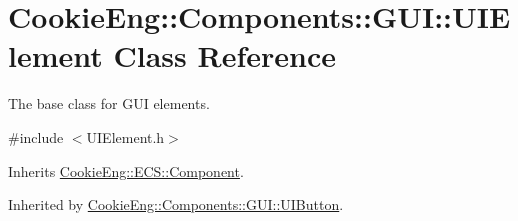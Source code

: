 \hypertarget{class_cookie_eng_1_1_components_1_1_g_u_i_1_1_u_i_element}{}\section{Cookie\+Eng\+:\+:Components\+:\+:G\+UI\+:\+:U\+I\+Element Class Reference}
\label{class_cookie_eng_1_1_components_1_1_g_u_i_1_1_u_i_element}


The base class for G\+UI elements.  




{\ttfamily \#include $<$U\+I\+Element.\+h$>$}



Inherits \hyperlink{class_cookie_eng_1_1_e_c_s_1_1_component}{Cookie\+Eng\+::\+E\+C\+S\+::\+Component}.



Inherited by \hyperlink{class_cookie_eng_1_1_components_1_1_g_u_i_1_1_u_i_button}{Cookie\+Eng\+::\+Components\+::\+G\+U\+I\+::\+U\+I\+Button}.

